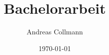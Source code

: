 \documentclass[
a4paper,
12pt,
oneside,
headsepline,		%
footsepline,		%
]{scrbook}
\title{Bachelorarbeit}
\author{Andreas Collmann}
\date{\today}
\begin{document}
 
 
 
 
 
 
 \tableofcontents
 \listoffigures
 \listoftables
 \lstlistoflistings
 
 
 
 
 
 
 
 
 \clearpage
 \appendix
 
 
 

 
\end{document}
